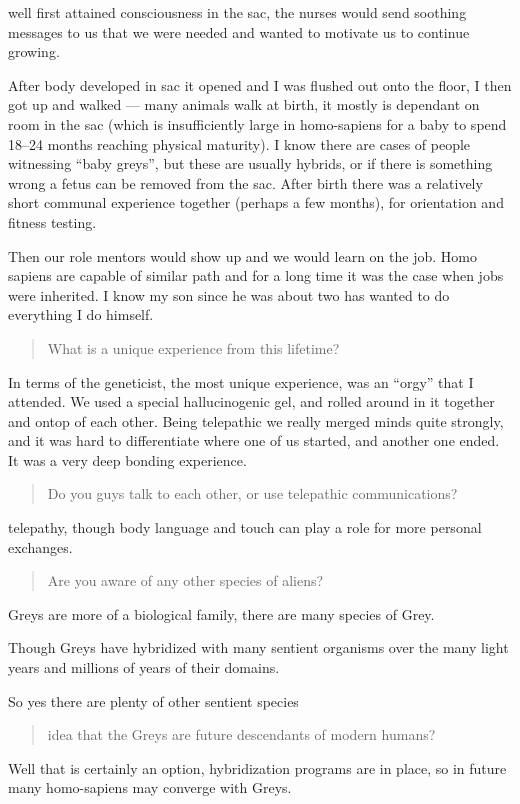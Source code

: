 well first attained consciousness in the sac, the nurses would send soothing
messages to us that we were needed and wanted to motivate us to continue
growing.

After body developed in sac it opened and I was flushed out onto the floor, I
then got up and walked --- many animals walk at birth, it mostly is dependant on
room in the sac (which is insufficiently large in homo-sapiens for a baby to
spend 18--24 months reaching physical maturity). I know there are cases of people
witnessing ``baby greys'', but these are usually hybrids, or if there is
something wrong a fetus can be removed from the sac. After birth there was a
relatively short communal experience together (perhaps a few months), for
orientation and fitness testing.

Then our role mentors would show up and we would learn on the job. Homo sapiens
are capable of similar path and for a long time it was the case when jobs were
inherited. I know my son since he was about two has wanted to do everything I do
himself.


\blockquote{What is a unique experience from this lifetime?}

In terms of the geneticist, the most unique experience, was an ``orgy'' that I
attended. We used a special hallucinogenic gel, and rolled around in it together
and ontop of each other. Being telepathic we really merged minds quite strongly,
and it was hard to differentiate where one of us started, and another one ended.
It was a very deep bonding experience.

\blockquote{Do you guys talk to each other, or use telepathic communications?}{}

telepathy, though body language and touch can play a role for more personal exchanges.

\blockquote{Are you aware of any other species of aliens?}


Greys are more of a biological family, there are many species of Grey.

Though Greys have hybridized with many sentient organisms over the many light
years and millions of years of their domains.

So yes there are plenty of other sentient species

\blockquote{idea that the Greys are future descendants of modern humans? }

Well that is certainly an option, hybridization programs are in place, so in
future many homo-sapiens may converge with Greys.


